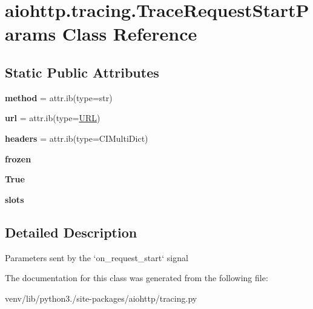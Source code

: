 \hypertarget{classaiohttp_1_1tracing_1_1_trace_request_start_params}{}\section{aiohttp.\+tracing.\+Trace\+Request\+Start\+Params Class Reference}
\label{classaiohttp_1_1tracing_1_1_trace_request_start_params}
\subsection*{Static Public Attributes}
\begin{DoxyCompactItemize}
\item 
\mbox{\label{classaiohttp_1_1tracing_1_1_trace_request_start_params_a2251fa2db2bb08acb6b16d3184952b16}} 
{\bfseries method} = attr.\+ib(type=str)
\item 
\mbox{\label{classaiohttp_1_1tracing_1_1_trace_request_start_params_a946a55089150cdb736d91a00804487f0}} 
{\bfseries url} = attr.\+ib(type=\hyperlink{classyarl_1_1_u_r_l}{U\+RL})
\item 
\mbox{\label{classaiohttp_1_1tracing_1_1_trace_request_start_params_a30ce0fc42a521482666b8ef4324fd279}} 
{\bfseries headers} = attr.\+ib(type=C\+I\+Multi\+Dict)
\item 
\mbox{\label{classaiohttp_1_1tracing_1_1_trace_request_start_params_a34c7cdfcf94dc62bef0b987559ca822b}} 
{\bfseries frozen}
\item 
\mbox{\label{classaiohttp_1_1tracing_1_1_trace_request_start_params_ac162e43fb007dd0421b8c571687b5c68}} 
{\bfseries True}
\item 
\mbox{\label{classaiohttp_1_1tracing_1_1_trace_request_start_params_a1aa3d2e36584135c0f416993e7c43eb5}} 
{\bfseries slots}
\end{DoxyCompactItemize}


\subsection{Detailed Description}
\begin{DoxyVerb}Parameters sent by the `on_request_start` signal\end{DoxyVerb}
 

The documentation for this class was generated from the following file\+:\begin{DoxyCompactItemize}
\item 
venv/lib/python3./site-\/packages/aiohttp/tracing.\+py\end{DoxyCompactItemize}
